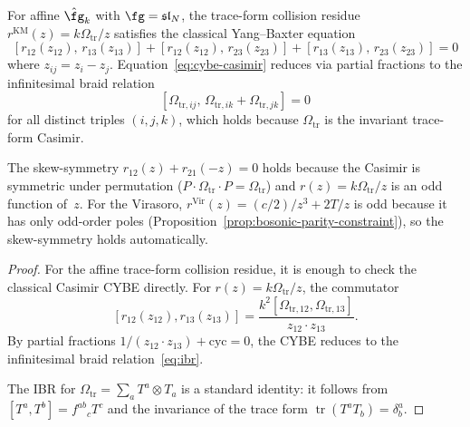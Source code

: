 \begin{proposition}
\label{prop:cybe-from-mc}
For affine $\hat\fg_k$ with $\fg = \mathfrak{sl}_N$,
the trace-form collision residue
$r^{\mathrm{KM}}(z)=k\Omega_{\mathrm{tr}}/z$
satisfies the classical Yang--Baxter equation
\begin{equation}\label{eq:cybe-casimir}
[r_{12}(z_{12}),\, r_{13}(z_{13})]
+ [r_{12}(z_{12}),\, r_{23}(z_{23})]
+ [r_{13}(z_{13}),\, r_{23}(z_{23})]
= 0
\end{equation}
where $z_{ij} = z_i - z_j$.
Equation~\eqref{eq:cybe-casimir} reduces via partial fractions
to the infinitesimal braid relation
\begin{equation}\label{eq:ibr}
[\Omega_{\mathrm{tr},ij},\,
 \Omega_{\mathrm{tr},ik}+\Omega_{\mathrm{tr},jk}] = 0
\end{equation}
for all distinct triples $(i,j,k)$, which holds because
$\Omega_{\mathrm{tr}}$ is the invariant trace-form Casimir.

\medskip\noindent
The skew-symmetry $r_{12}(z) + r_{21}(-z) = 0$ holds because the
Casimir is symmetric under permutation
($P \cdot \Omega_{\mathrm{tr}} \cdot P
= \Omega_{\mathrm{tr}}$) and
$r(z)=k\Omega_{\mathrm{tr}}/z$ is an odd function of~$z$.
For the Virasoro, $r^{\mathrm{Vir}}(z) = (c/2)/z^3 + 2T/z$
is odd because it has only odd-order poles
\textup{(}Proposition~\textup{\ref{prop:bosonic-parity-constraint})},
so the skew-symmetry holds automatically.
\end{proposition}

\begin{proof}
For the affine trace-form collision residue, it is enough to check the
classical Casimir CYBE directly.
For $r(z)=k\Omega_{\mathrm{tr}}/z$, the commutator
\[
[r_{12}(z_{12}), r_{13}(z_{13})]
=
\frac{k^2[\Omega_{\mathrm{tr},12},\Omega_{\mathrm{tr},13}]}
{z_{12}\cdot z_{13}}.
\]
By partial fractions $1/(z_{12}\cdot z_{13}) + \text{cyc} = 0$,
the CYBE reduces to the infinitesimal braid relation~\eqref{eq:ibr}.

The IBR for
$\Omega_{\mathrm{tr}}=\sum_a T^a \otimes T_a$ is a standard identity:
it follows from $[T^a, T^b] = f^{ab}{}_c T^c$ and the invariance of the
trace form $\operatorname{tr}(T^a T_b)=\delta^a_b$.
\end{proof}

